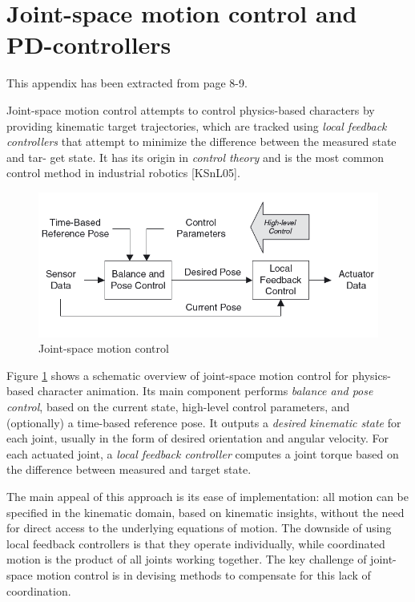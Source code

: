 \documentclass[runningheads,a4paper,10pt]{llncs}
\begin{document}
\section{Joint-space motion control and PD-controllers}

This appendix has been extracted from \cite{geijtenbeek2012interactive} page 8-9.
\vspace{5mm} %


Joint-space motion control attempts to control physics-based characters by providing kinematic target trajectories, which are tracked using \textit{local feedback controllers} that attempt to minimize the difference between the measured state and tar- get state. It has its origin in \textit{control theory} and is the most common control method in industrial robotics [KSnL05]. 



\begin{figure}[h]
\centering
\includegraphics[width=0.5\columnwidth]{images/joint_space_motion_control.png}

\caption{Joint-space motion control}
\label{fig:joint_space_motion_control}
\end{figure}


Figure \ref{fig:joint_space_motion_control} shows a schematic overview of joint-space motion control for physics-based character animation. Its main component performs \textit{balance and pose control}, based on the current state, high-level control parameters, and (optionally) a time-based reference pose. It outputs a \textit{desired kinematic state} for each joint, usually in the form of desired orientation and angular velocity. For each actuated joint, a \textit{local feedback controller} computes a joint torque based on the difference between measured and target state. 

The main appeal of this approach is its ease of implementation: all motion can be specified in the kinematic domain, based on kinematic insights, without the need for direct access to the underlying equations of motion. The downside of using local feedback controllers is that they operate individually, while coordinated motion is the product of all joints working together. The key challenge of joint-space motion control is in devising methods to compensate for this lack of coordination. 
\end{document}
